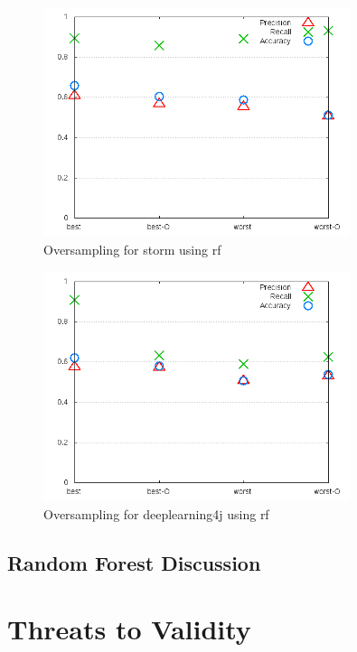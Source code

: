 \begin{figure}[!h]
    \centering
        \includegraphics[width=0.8\textwidth]{images/rf/test_4/storm_sample_range}
        \caption{Oversampling for storm using \gls{rf}}
        \label{fig:test_4_storm_rf}
\end{figure}

\begin{figure}[!h]
    \centering
        \includegraphics[width=0.8\textwidth]{images/rf/test_4/deeplearning4j_sample_range}
    \caption{Oversampling for deeplearning4j using \gls{rf}}
    \label{fig:test_4_deeplearning4j_rf}
\end{figure}

\subsection{Random Forest Discussion}
\label{subsec:rf_discussion}

\section{Threats to Validity}
\label{sec:threat_validity}

